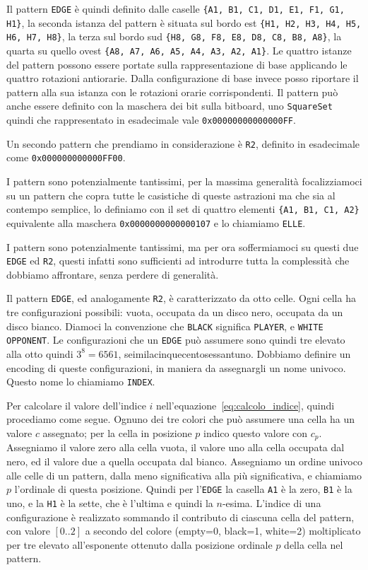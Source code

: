 Il pattern \texttt{EDGE} è quindi definito dalle caselle \texttt{\{A1, B1, C1, D1, E1, F1, G1, H1\}}, la seconda istanza del pattern è situata
sul bordo est \texttt{\{H1, H2, H3, H4, H5, H6, H7, H8\}}, la terza sul bordo sud \texttt{\{H8, G8, F8, E8, D8, C8, B8, A8\}},
la quarta su quello ovest \texttt{\{A8, A7, A6, A5, A4, A3, A2, A1\}}.
Le quattro istanze del pattern possono essere portate sulla rappresentazione di base applicando le quattro rotazioni antiorarie.
Dalla configurazione di base invece posso riportare il pattern alla sua istanza con le rotazioni orarie corrispondenti.
Il pattern può anche essere definito con la maschera dei bit sulla bitboard, uno \texttt{SquareSet} quindi che
rappresentato in esadecimale vale \texttt{0x00000000000000FF}.

Un secondo pattern che prendiamo in considerazione è \texttt{R2}, definito in esadecimale come \texttt{0x000000000000FF00}.

I pattern sono potenzialmente tantissimi, per la massima generalità focalizziamoci su un pattern che copra tutte le casistiche di queste
astrazioni ma che sia al contempo semplice, lo definiamo con il set di quattro elementi \texttt{\{A1, B1, C1, A2\}} equivalente alla maschera
\texttt{0x0000000000000107} e lo chiamiamo \texttt{ELLE}.

I pattern sono potenzialmente tantissimi, ma per ora soffermiamoci su questi due \texttt{EDGE} ed \texttt{R2}, questi infatti sono sufficienti
ad introdurre tutta la complessità che dobbiamo affrontare, senza perdere di generalità.

Il pattern \texttt{EDGE}, ed analogamente \texttt{R2}, è caratterizzato da otto celle.
Ogni cella ha tre configurazioni possibili: vuota, occupata da un disco nero, occupata da un disco bianco.
Diamoci la convenzione che \texttt{BLACK} significa \texttt{PLAYER}, e \texttt{WHITE} \texttt{OPPONENT}.
Le configurazioni che un \texttt{EDGE} può assumere sono quindi tre elevato alla otto quindi $3^8 = 6561$, seimilacinquecentosessantuno.
Dobbiamo definire un encoding di queste configurazioni, in maniera da assegnargli un nome univoco.
Questo nome lo chiamiamo \texttt{INDEX}.

Per calcolare il valore dell'indice $i$ nell'equazione~\ref{eq:calcolo_indice}, quindi procediamo come segue.
Ognuno dei tre colori che può assumere una cella ha un valore $c$ assegnato; per la cella in posizione $p$ indico questo valore con $c_p$.
Assegniamo il valore zero alla cella vuota, il valore uno alla cella occupata dal nero, ed il valore due a quella occupata dal bianco.
Assegniamo un ordine univoco alle celle di un pattern, dalla meno significativa alla più significativa, e chiamiamo $p$ l'ordinale di questa posizione.
Quindi per l'\texttt{EDGE} la casella \texttt{A1} è la zero, \texttt{B1} è la uno, e la \texttt{H1} è la sette, che è l'ultima e quindi la $n$-esima.
L'indice di una configurazione è realizzato sommando il contributo di ciascuna cella del pattern,
con valore $[0..2]$ a secondo del colore (empty=0, black=1, white=2)
moltiplicato per tre elevato all'esponente ottenuto dalla posizione ordinale $p$ della cella nel pattern.



